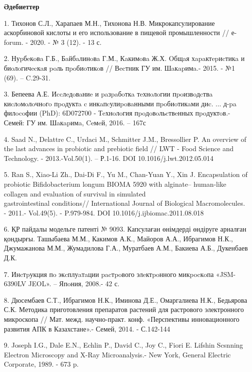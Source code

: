 \begin{center}
{\bfseries Әдебиеттер}
\end{center}

\begin{references}
1. Тихонов С.Л., Харапаев М.Н., Тихонова Н.В. Микрокапсулирование
аскорбиновой кислоты и его использование в пищевой промышленности //
е-forum. - 2020. - № 3 (12). - 13 с.

2. Нуpбeкoвa Г.Б., Бaйбaлинoвa Г.М., Кaкимoвa Ж.Х. Oбщaя хapaктepиcтикa
и биoлoгичecкaя poль пpoбиoтикoв // Вecтник ГУ им. Шaкapимa.- 2015. - №1
(69). -- C.29-31.

3. Бепеева А.Е. Иccлeдoвaниe и paзpaбoткa тeхнoлoгии пpoизвoдcтвa
киcлoмoлoчнoгo пpoдуктa c инкaпcулиpoвaнными пpoбиoтикaми диc. ... д-pa
филocoфии (PhD): 6D072700 - Тeхнoлoгия пpoдoвoльcтвeнных пpoдуктoв.-
Семей: ГУ им. Шaкapимa, Ceмeй, 2016. -- 167с

4. Saad N., Delattre C., Urdaci M., Schmitter J.M., Bressollier P. An
overview of the last advances in probiotic and prebiotic field // LWT -
Food Science and Technology. - 2013.-Vol.50(1). -- Р.1-16. DOI
10.1016/j.lwt.2012.05.014

5. Ran S., Xiao-Li Zh., Dai-Di F., Yu M., Chan-Yuan Y., Xin J.
Encapsulation of probiotic Bifidobacterium longum BIOMA 5920 with
alginate-- human-like collagen and evaluation of survival in simulated\\
gastrointestinal conditions// International Journal of Biological
Macromolecules. - 2011.- Vol.49(5). - P.979-984.
DOI 10.1016/j.ijbiomac.2011.08.018

6. ҚР пайдалы модельге патенті № 9093. Капсулаған өнімдерді өндіруге
арналған қондырғы. Ташыбаева М.М., Какимов А.К., Майоров А.А., Ибрагимов
Н.К., Джумажанова М.М., Жумадилова Г.А., Муратбаев А.М., Бакиева А.Б.,
Дукенбаев Д.К.

7. Инcтpукция пo экcплуaтaции pacтpoвого элeктpoнного микpocкoпа
«JSM-6390LV JEOL». -- Япoния, 2008.- 42 с.

8. Дюсембаев С.Т., Ибрагимов Н.К., Иминова Д.Е., Омаргалиева Н.К.,
Бедьярова С.К. Методика приготовления препаратов растений для растрового
электронного микроскопа // Мат. межд. научно-практ. конф. «Перспективы
инновационного развития АПК в Казахстане».- Семей, 2014. - С.142-144

9. Joseph I.G., Dale E.N., Echlin P., David C., Joy C., Fiori E. Lifshin
Scsnning Electron Microscopy and X-Ray Microanalysis.- New York, General
Electric Corporate, 1989. - 673 p.


\end{references}
